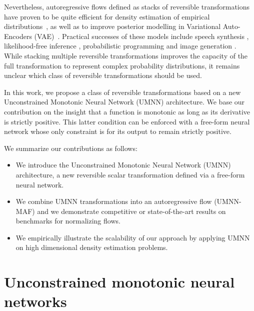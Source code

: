 Nevertheless, autoregressive flows defined as stacks of reversible transformations have proven to be quite efficient for density estimation of empirical distributions~\citep{papamakarios_sequential_2019, papamakarios_masked_2017, huang_neural_2018}, as well as to improve posterior modelling in Variational Auto-Encoders (VAE)~\citep{germain_made_2015, kingma_improved_2016, huang_neural_2018}.
Practical successes of these models include speech synthesis \citep{van_den_oord_wavenet_2016, van_den_oord_parallel_2018}, likelihood-free inference \citep{papamakarios_sequential_2019}, probabilistic programming \citep{van_de_meent_introduction_2018} and image generation \citep{kingma_glow_2018}.
While stacking multiple reversible transformations improves the capacity of the full transformation to represent complex probability distributions, it remains unclear which class of reversible transformations should be used.

In this work, we propose a class of reversible transformations based on a new Unconstrained Monotonic Neural Network (UMNN) architecture. We base our contribution on the insight that a function is monotonic as long as its derivative is strictly positive. This latter condition can be enforced with a free-form neural network whose only constraint is for its output to remain strictly positive.

We summarize our contributions as follows:
\begin{itemize}
    \item We introduce the Unconstrained Monotonic Neural Network (UMNN) architecture, a new reversible scalar transformation defined via a free-form neural network.
    \item We combine UMNN transformations into an autoregressive flow (UMNN-MAF) and we demonstrate competitive or state-of-the-art results on benchmarks for normalizing flows.
    \item We empirically illustrate the scalability of our approach by applying UMNN on high dimensional density estimation problems.
\end{itemize}



\section{Unconstrained monotonic neural networks}
\label{umnn}

